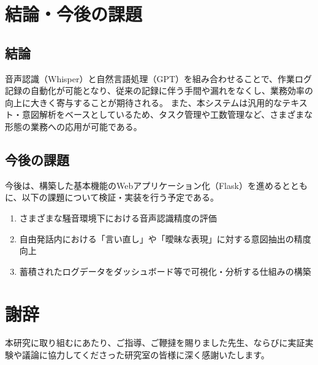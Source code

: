 \documentclass[a4paper,12pt,ja=standard,lualatex]{bxjsarticle}
\begin{document}
\newpage

\section{結論・今後の課題}\label{sec5}

\subsection{結論}
音声認識（Whisper）と自然言語処理（GPT）を組み合わせることで、作業ログ記録の自動化が可能となり、従来の記録に伴う手間や漏れをなくし、業務効率の向上に大きく寄与することが期待される。
また、本システムは汎用的なテキスト・意図解析をベースとしているため、タスク管理や工数管理など、さまざまな形態の業務への応用が可能である。

\subsection{今後の課題}
今後は、構築した基本機能のWebアプリケーション化（Flask）を進めるとともに、以下の課題について検証・実装を行う予定である。
\begin{enumerate}
    \item さまざまな騒音環境下における音声認識精度の評価
    \item 自由発話内における「言い直し」や「曖昧な表現」に対する意図抽出の精度向上
    \item 蓄積されたログデータをダッシュボード等で可視化・分析する仕組みの構築
\end{enumerate}

\newpage

\section*{謝辞}
本研究に取り組むにあたり、ご指導、ご鞭撻を賜りました先生、ならびに実証実験や議論に協力してくださった研究室の皆様に深く感謝いたします。

\newpage




\newpage
\appendix
\end{document}
